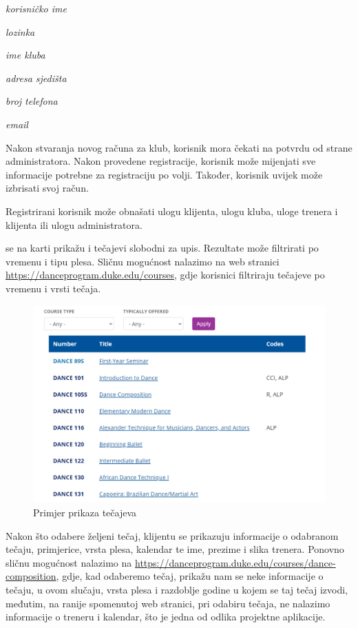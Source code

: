\begin{packed_item}
	\item \textit{korisničko ime}
	\item \textit{lozinka}
	\item \textit{ime kluba}
	\item \textit{adresa sjedišta}
	\item \textit{broj telefona}
	\item \textit{email}
\end{packed_item}

\noindent Nakon stvaranja novog računa za klub, korisnik mora čekati na potvrdu od strane administratora.  Nakon provedene registracije, korisnik može mijenjati sve informacije potrebne za registraciju po volji. Također, korisnik uvijek može izbrisati svoj račun.

\noindent Registrirani korisnik može obnašati ulogu klijenta, ulogu kluba, uloge trenera i klijenta ili ulogu administratora.

\noindent {} se na karti prikažu i tečajevi slobodni za upis. Rezultate može filtrirati po vremenu i tipu plesa. Sličnu mogućnost nalazimo na web stranici \url{https://danceprogram.duke.edu/courses}, gdje korisnici filtriraju tečajeve po vremenu i vrsti tečaja.

\begin{figure}[H]
	\centering
	\includegraphics[scale=0.3]{slike/opis_1.png}
	\caption{Primjer prikaza tečajeva}
	\label{fig:screenshot001}
\end{figure}

\noindent Nakon što odabere željeni tečaj, klijentu se prikazuju informacije o odabranom tečaju, primjerice, vrsta plesa, kalendar te ime, prezime i slika trenera. Ponovno sličnu mogućnost nalazimo na \url{https://danceprogram.duke.edu/courses/dance-composition}, gdje, kad odaberemo tečaj, prikažu nam se neke informacije o tečaju, u ovom slučaju, vrsta plesa i razdoblje godine u kojem se taj tečaj izvodi, međutim, na ranije spomenutoj web stranici, pri odabiru tečaja, ne nalazimo informacije o treneru i kalendar, što je jedna od odlika projektne aplikacije.

